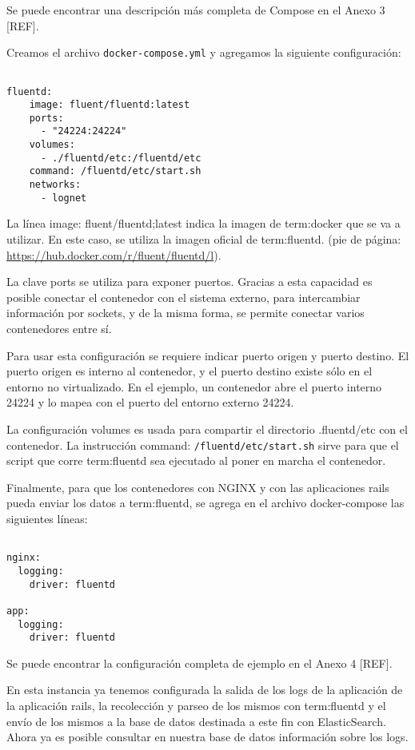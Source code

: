 Se puede encontrar una descripción más completa de Compose en el Anexo 3 [REF].

Creamos el archivo \texttt{docker-compose.yml} y agregamos la siguiente configuración:

\begin{lstlisting}

fluentd:
    image: fluent/fluentd:latest
    ports:
      - "24224:24224"
    volumes:
      - ./fluentd/etc:/fluentd/etc
    command: /fluentd/etc/start.sh
    networks:
      - lognet

\end{lstlisting}

La línea image: fluent/fluentd;latest indica la imagen de \gls{term:docker} que se va a
utilizar. En este caso, se utiliza la imagen oficial de \gls{term:fluentd}. (pie de
página: \url{https://hub.docker.com/r/fluent/fluentd/l}).

La clave ports se utiliza para exponer puertos. Gracias a esta capacidad es
posible conectar el contenedor con el sistema externo, para intercambiar
información por sockets, y de la misma forma, se permite conectar varios
contenedores entre sí.

Para usar esta configuración se requiere indicar puerto origen y puerto
destino. El puerto origen es interno al contenedor, y el puerto destino existe
sólo en el entorno no virtualizado. En el ejemplo, un contenedor abre el puerto
interno 24224 y lo mapea con el puerto del entorno externo 24224.

La configuración volumes es usada para compartir el directorio .fluentd/etc con
el contenedor. La instrucción command: \texttt{/fluentd/etc/start.sh} sirve para que el
script que corre \gls{term:fluentd} sea ejecutado al poner en marcha el contenedor.

Finalmente, para que los contenedores con NGINX y con las aplicaciones rails
pueda enviar los datos a \gls{term:fluentd}, se agrega en el archivo docker-compose las
siguientes líneas:

\begin{lstlisting}

nginx:
  logging:
    driver: fluentd

app:
  logging:
    driver: fluentd

\end{lstlisting}

Se puede encontrar la configuración completa de ejemplo en el Anexo 4 [REF].

En esta instancia ya tenemos configurada la salida de los logs de la aplicación
de la aplicación rails, la recolección y parseo de los mismos con \gls{term:fluentd} y el
envío de los mismos a la base de datos destinada a este fin con ElasticSearch.
Ahora ya es posible consultar en nuestra base de datos información sobre los
logs.

